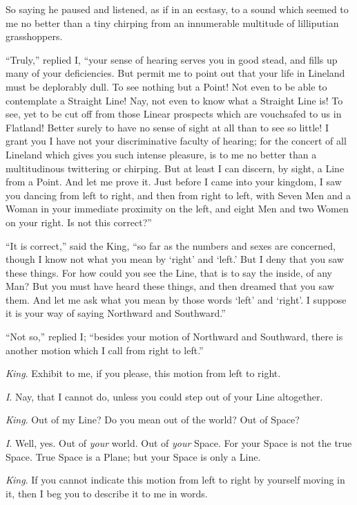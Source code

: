 \documentclass[10pt, kindle, oneside]{kindle}
\begin{document}
So saying he paused and listened, as if in an ecstasy, to a sound which seemed
to me no better than a tiny chirping from an innumerable multitude of
lilliputian grasshoppers.

``Truly,'' replied I, ``your sense of hearing serves you in good stead, and fills
up many of your deficiencies. But permit me to point out that your life in
Lineland must be deplorably dull. To see nothing but a Point! Not even to be
able to contemplate a Straight Line! Nay, not even to know what a Straight
Line is! To see, yet to be cut off from those Linear prospects which are
vouchsafed to us in Flatland! Better surely to have no sense of sight at all
than to see so little! I grant you I have not your discriminative faculty of
hearing; for the concert of all Lineland which gives you such intense
pleasure, is to me no better than a multitudinous twittering or chirping. But
at least I can discern, by sight, a Line from a Point. And let me prove it.
Just before I came into your kingdom, I saw you dancing from left to right,
and then from right to left, with Seven Men and a Woman in your immediate
proximity on the left, and eight Men and two Women on your right. Is not this
correct?''

``It is correct,'' said the King, ``so far as the numbers and sexes are
concerned, though I know not what you mean by `right' and `left.' But I deny
that you saw these things. For how could you see the Line, that is to say the
inside, of any Man? But you must have heard these things, and then dreamed
that you saw them. And let me ask what you mean by those words `left' and
`right'. I suppose it is your way of saying Northward and Southward.''

``Not so,'' replied I; ``besides your motion of Northward and Southward, there is
another motion which I call from right to left.''

\emph{King}. Exhibit to me, if you please, this motion from left to right.

\emph{I}. Nay, that I cannot do, unless you could step out of your Line altogether.

\emph{King}. Out of my Line? Do you mean out of the world? Out of Space?

\emph{I}. Well, yes. Out of \emph{your} world. Out of \emph{your} Space. For your Space is not the
true Space. True Space is a Plane; but your Space is only a Line.

\emph{King}. If you cannot indicate this motion from left to right by yourself moving
in it, then I beg you to describe it to me in words.
\end{document}
